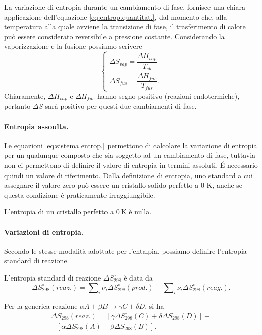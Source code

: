 La variazione di entropia durante un cambiamento di fase, fornisce una chiara applicazione dell'equazione \eqref{eq:entrop.quantitat.}, dal momento che, alla temperatura alla quale avviene la transizione di fase, il trasferimento di calore può essere considerato reversibile a pressione costante. Considerando la vaporizzazione e la fusione
possiamo scrivere
\begin{equation}\label{eq:sistema entrop.}
    \begin{cases}
        \Delta S_{vap}=\dfrac{\Delta H_{vap}}{T_{eb}}\\[2ex]
        \Delta S_{fus}=\dfrac{\Delta H_{fus}}{T_{fus}}.
    \end{cases}
\end{equation}
Chiaramente, $\Delta H_{vap}$ e $\Delta H_{fus}$ hanno segno positivo (reazioni endotermiche), pertanto $\Delta S$ sarà positivo per questi due cambiamenti di fase.

\paragraph{Entropia assoulta.} Le equazioni \eqref{eq:sistema entrop.}  permettono di calcolare la variazione di entropia per un qualunque composto che sia soggetto ad un cambiamento di fase, tuttavia non ci permettono di definire il valore di entropia in termini assoluti. \'E necessario quindi un valore di riferimento. Dalla definizione di entropia, uno standard a cui assegnare il valore zero può essere un cristallo solido perfetto a 0 K, anche se questa condizione è praticamente irraggiungibile.
\begin{defn}
     L'entropia di un cristallo perfetto a $\SI{0}{\kelvin}$ è nulla.
\end{defn}

\paragraph{Variazioni di entropia.} Secondo le stesse modalità adottate per l'entalpia, possiamo definire l'entropia standard di reazione.
\begin{defn}
    L'entropia standard di reazione $\Delta S_{298}^\circ$ è data da
    \begin{equation}
        \Delta S_{298}^\circ(reaz.)=\sum\nolimits_i\nu_i\Delta S_{298}^\circ(prod.)-\sum\nolimits_i\nu_i\Delta S_{298}^\circ(reag.).
    \end{equation}
\end{defn}
Per la generica reazione $\alpha A+\beta B\to\gamma C+\delta D$, si ha
\begin{multline}
\label{eq:entrp.reaz.std}
    \Delta S_{298}^\circ(reaz.)=[\gamma\Delta S_{298}^\circ(C)+\delta\Delta S_{298}^\circ(D)]- \\
    -[\alpha\Delta S_{298}^\circ(A)+\beta\Delta S_{298}^\circ(B)].
\end{multline}


